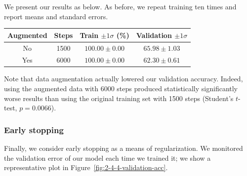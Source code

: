 \documentclass{article}
\begin{document}
\begin{multicols}{2}
We present our results as below.
As before, we repeat training ten times
and report means and standard errors.
\begin{center}
    \begin{tabular}{cc|cc}
        Augmented & Steps & Train $\pm 1 \sigma$ (\%) & Validation $\pm 1 \sigma$\\\hline
        No  & 1500 & $100.00 \pm 0.00$ & $65.98 \pm 1.03$ \\
        Yes & 6000 & $100.00 \pm 0.00$ & $62.30 \pm 0.61$
    \end{tabular}
\end{center}

Note that data augmentation actually lowered our validation accuracy.
Indeed, using the augmented data with 6000 steps
produced statistically significantly worse results
than using the original training set with 1500 steps
(Student's $t$-test, $p=0.0066$).






\subsubsection{Early stopping}

Finally, we consider early stopping as a means of regularization.
We monitored the validation error
of our model each time we trained it;
we show a representative plot in Figure~\ref{fig:2-4-4-validation-acc}.


\end{multicols}
\end{document}
